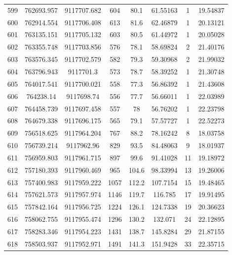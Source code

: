 \begin{longtable}{cccccccc}
599  & 762693.957      & 9117707.682      & 604     & 80.1  & 61.55163 & 1  & 19.54837 \\
600  & 762914.554      & 9117706.408      & 613     & 81.6  & 62.46879 & 1  & 20.13121 \\
601  & 763135.151      & 9117705.132      & 603     & 80.5  & 61.44972 & 1  & 20.05028 \\
602  & 763355.748      & 9117703.856      & 576     & 78.1  & 58.69824 & 2  & 21.40176 \\
603  & 763576.345      & 9117702.579      & 582     & 79.3  & 59.30968 & 2  & 21.99032 \\
604  & 763796.943      & 9117701.3        & 573     & 78.7  & 58.39252 & 1  & 21.30748 \\
605  & 764017.541      & 9117700.021      & 558     & 77.3  & 56.86392 & 1  & 21.43608 \\
606  & 764238.14       & 9117698.74       & 556     & 77.7  & 56.66011 & 1  & 22.03989 \\
607  & 764458.739      & 9117697.458      & 557     & 78    & 56.76202 & 1  & 22.23798 \\
608  & 764679.338      & 9117696.175      & 565     & 79.1  & 57.57727 & 1  & 22.52273 \\
609  & 756518.625      & 9117964.204      & 767     & 88.2  & 78.16242 & 8  & 18.03758 \\
610  & 756739.214      & 9117962.96       & 829     & 93.5  & 84.48063 & 9  & 18.01937 \\
611  & 756959.803      & 9117961.715      & 897     & 99.6  & 91.41028 & 11 & 19.18972 \\
612  & 757180.393      & 9117960.469      & 965     & 104.6 & 98.33994 & 13 & 19.26006 \\
613  & 757400.983      & 9117959.222      & 1057    & 112.2 & 107.7154 & 15 & 19.48465 \\
614  & 757621.573      & 9117957.974      & 1146    & 119.7 & 116.785  & 17 & 19.91495 \\
615  & 757842.164      & 9117956.725      & 1224    & 126.1 & 124.7338 & 19 & 20.36623 \\
616  & 758062.755      & 9117955.474      & 1296    & 130.2 & 132.071  & 24 & 22.12895 \\
617  & 758283.346      & 9117954.223      & 1431    & 138.7 & 145.8284 & 29 & 21.87155 \\
618  & 758503.937      & 9117952.971      & 1491    & 141.3 & 151.9428 & 33 & 22.35715 \\

\end{longtable}

